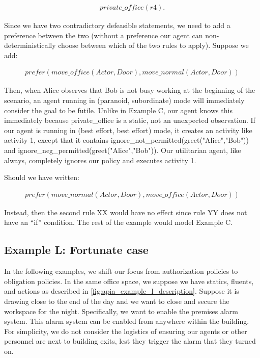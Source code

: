 \begin{equation}
\begin{split}
private\_office(r4).
\end{split}
\end{equation}

Since we have two contradictory defeasible statements, we need to add a preference between the two (without a preference our agent can non-deterministically choose between which of the two rules to apply).
Suppose we add:

\begin{equation}
\begin{split}
prefer(move\_office(Actor, Door), move\_normal(Actor, Door))
\end{split}
\end{equation}

Then, when Alice observes that Bob is not busy working at the beginning of the scenario, an agent running in (paranoid, subordinate) mode will immediately consider the goal to be futile.
Unlike in Example C, our agent knows this immediately because private\_office is a static, not an unexpected observation.
If our agent is running in (best effort, best effort) mode, it creates an activity like activity 1, except that it contains ignore\_not\_permitted(greet("Alice","Bob")) and ignore\_neg\_permitted(greet("Alice","Bob")).
Our utilitarian agent, like always, completely ignores our policy and executes activity 1.

Should we have written:

\begin{equation}
\begin{split}
prefer(move\_normal(Actor, Door), move\_office(Actor, Door))
\end{split}
\end{equation}

Instead, then the second rule XX would have no effect since rule YY does not have an ``if'' condition.
The rest of the example would model Example C.

\subsection{Example L: Fortunate case}

In the following examples, we shift our focus from authorization policies to obligation policies.
In the same office space, we suppose we have statics, fluents, and actions as described in \cref{fig:apia_example_l_description}.
Suppose it is drawing close to the end of the day and we want to close and secure the workspace for the night.
Specifically, we want to enable the premises alarm system.
This alarm system can be enabled from anywhere within the building.
For simplicity, we do not consider the logistics of ensuring our agents or other personnel are next to building exits, lest they trigger the alarm that they turned on.

